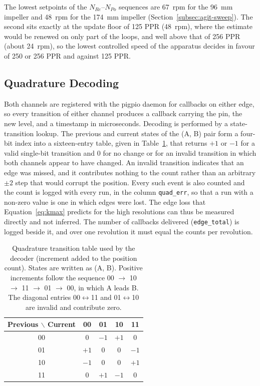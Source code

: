 The lowest setpoints of the $N_{Re}$--$N_{Po}$ sequences are 67~rpm for the 96~mm impeller and 48~rpm for the 174~mm impeller (Section~\ref{subsec:agit-sweep}). The second sits exactly at the update floor of 125 PPR (48~rpm), where the estimate would be renewed on only part of the loops, and well above that of 256 PPR (about 24~rpm), so the lowest controlled speed of the apparatus decides in favour of 250 or 256 PPR and against 125 PPR.

\subsection{Quadrature Decoding}
\label{subsec:agit-quad}

Both channels are registered with the pigpio daemon for callbacks on either edge, so every transition of either channel produces a callback carrying the pin, the new level, and a timestamp in microseconds. Decoding is performed by a state-transition lookup. The previous and current states of the (A, B) pair form a four-bit index into a sixteen-entry table, given in Table~\ref{tab:quad}, that returns $+1$ or $-1$ for a valid single-bit transition and $0$ for no change or for an invalid transition in which both channels appear to have changed. An invalid transition indicates that an edge was missed, and it contributes nothing to the count rather than an arbitrary $\pm 2$ step that would corrupt the position. Every such event is also counted and the count is logged with every run, in the column \texttt{quad\_err}, so that a run with a non-zero value is one in which edges were lost. The edge loss that Equation~\ref{eq:kmax} predicts for the high resolutions can thus be measured directly and not inferred. The number of callbacks delivered (\texttt{edge\_total}) is logged beside it, and over one revolution it must equal the counts per revolution.

\begin{table}[htbp]
    \centering
    \caption[Quadrature transition table]{Quadrature transition table used by the decoder (increment added to the position count). States are written as (A, B). Positive increments follow the sequence 00 $\rightarrow$ 10 $\rightarrow$ 11 $\rightarrow$ 01 $\rightarrow$ 00, in which A leads B. The diagonal entries 00$\leftrightarrow$11 and 01$\leftrightarrow$10 are invalid and contribute zero.}
    \label{tab:quad}
    \begin{tabular}{@{}c|cccc@{}}
        \toprule
        Previous $\backslash$ Current & 00 & 01 & 10 & 11 \\
        \midrule
        00 & 0 & $-1$ & $+1$ & 0 \\
        01 & $+1$ & 0 & 0 & $-1$ \\
        10 & $-1$ & 0 & 0 & $+1$ \\
        11 & 0 & $+1$ & $-1$ & 0 \\
        \bottomrule
    \end{tabular}
\end{table}

